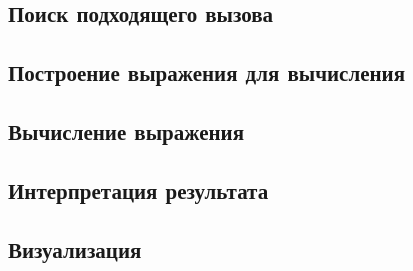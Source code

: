 \subsection{Поиск подходящего вызова}

\subsection{Построение выражения для вычисления}

\subsection{Вычисление выражения}

\subsection{Интерпретация результата}

\subsection{Визуализация}
